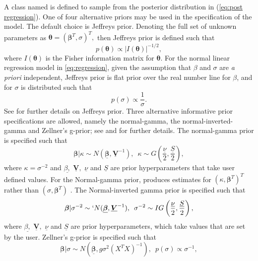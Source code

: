\documentclass[article]{jss}
\begin{document}
A class named  is defined to sample from the
posterior distribution in (\ref{eq:post regression}). One of four
alternative priors may be used in the specification of the model.  The
default choice is Jeffreys prior. Denoting the full set of unknown
parameters as $\bm{\theta}=(\bm{\beta}^{T},\sigma)^{T},$ then Jeffreys
prior is defined such that 
\begin{equation}
  p(\bm{\theta})\propto|I(\bm{\theta})|^{-1/2},\label{eq:Jeffrey's
    Prior}
\end{equation} 
where $I(\bm{\theta})$ is the Fisher information matrix for
$\bm{\theta}.$ For the normal linear regression model in
\ref{eq:regression}, given the assumption that $\beta$ and $\sigma$
are \emph{a priori} independent, Jeffreys prior is flat prior over the
real number line for $\beta$, and for $\sigma$ is distributed such
that
\begin{equation}
		p\left(\sigma\right)\propto\frac{1}{\sigma}.
\end{equation}
See \cite{Zellner1971} for further details on Jeffreys prior. Three
alternative informative prior specifications are allowed, namely the
normal-gamma, the normal-inverted-gamma and Zellner's g-prior; see
\cite{Zellner1971} and \cite{MarinRobert2007} for further details.
The normal-gamma prior is specified such that
\begin{equation}
  \bm{\beta}|\kappa\sim
  N(\bm{\underline{\beta}},\underline{\bm{V}}^{-1}),\,\,\,\kappa\sim
  G\left(\frac{\underline{\nu}}{2},\frac{\underline{S}}{2}\right),\label{eq:Normal
    Gamma}
\end{equation} 
where $\kappa=\sigma^{-2}$ and $\underline{\beta,}$
$\underline{\bm{V}},$ $\underline{\nu}$ and $\underline{S}$ are prior
hyperparameters that take user defined values. For the Normal-gamma
prior,  produces estimates for\emph{
  $\left(\kappa,\bm{\beta}^{T}\right)^{T}$ }rather than
$\left(\sigma,\bm{\beta}^{T}\right)$ . The Normal-inverted gamma prior
is specified such that
\begin{equation}
  \bm{\beta}|\sigma^{-2}\sim`
  N(\bm{\underline{\beta}},\underline{\bm{V}}^{-1}),\,\,\,\sigma^{-2}\sim
  IG\left(\frac{\underline{\nu}}{2},\frac{\underline{S}}{2}\right),\label{eq:Normal
    Inverted Gamma}
\end{equation} 
where $\underline{\beta,}$ $\underline{\bm{V}},$ $\underline{\nu}$ and
$\underline{S}$ are prior hyperparameters, which take values that are
set by the user. Zellner's g-prior is specified such that
\begin{equation} \bm{\beta}|\sigma\sim
  N\left(\underline{\bm{\beta}},g\sigma^{2}\left(X^{T}X\right)^{-1}\right),\,\,\,
  p(\sigma)\propto\sigma^{-1},\label{eq:g-prior}
\end{equation}
\end{document}
